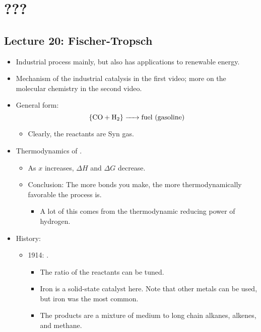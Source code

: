 \documentclass[../notes.tex]{subfiles}
\begin{document}
\chapter{???}
\section{Lecture 20: Fischer-Tropsch}
\begin{itemize}
    \item {}Industrial process mainly, but also has applications to renewable energy.
    \item Mechanism of the industrial catalysis in the first video; more on the molecular chemistry in the second video.
    \item General form:
    \begin{equation*}
        \ce{\{CO + H2\} -> {fuel (gasoline)}}
    \end{equation*}
    \begin{itemize}
        \item Clearly, the reactants are Syn gas.
    \end{itemize}
    \item Thermodynamics of .
    \begin{itemize}
        \item As $x$ increases, $\Delta H$ and $\Delta G$ decrease.
        \item Conclusion: The more  bonds you make, the more thermodynamically favorable the process is.
        \begin{itemize}
            \item A lot of this comes from the thermodynamic reducing power of hydrogen.
        \end{itemize}
    \end{itemize}
    \item History:
    \begin{itemize}
        \item 1914: .
        \begin{itemize}
            \item The ratio of the reactants can be tuned.
            \item Iron is a solid-state catalyst here. Note that other metals can be used, but iron was the most common.
            \item The products are a mixture of medium to long chain alkanes, alkenes, and methane.

\end{itemize}
\end{itemize}
\end{itemize}
\end{document}
